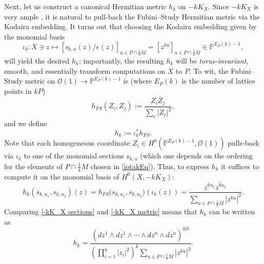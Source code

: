 \documentclass{article}
\newcommand\cO{{\mathcal O}}
\newcommand{\PP}{{\mathbb P}}
\renewcommand{\>}{\rightarrow}
\theoremstyle{plain}
\theoremstyle{definition}
\newcommand{\beq}{\begin{equation}}
\newcommand{\eeq}{\end{equation}}
\def\lb#1{\label{#1}}
\begin{document}
Next, let us construct a canonical Hermitian metric $h_k$ on $-kK_X$. 
Since $-kK_X$ is very ample \cite[p. 70]{Ful}, it is natural to pull-back the Fubini--Study Hermitian metric via the Kodaira embedding. It turns
out that choosing the Kodaira embedding given by the monomial basis 
\begin{equation}\label{iotakEq}
\iota_k:X\ni z\mapsto [s_{k,u}(z)/e(z)]_{u\in P\cap \frac1k M}=[z^{ku}]_{u\in P\cap \frac1k M}\in \PP^{E_P(k)-1},
\end{equation}
will yield the desired $h_k$; importantly, the resulting $h_k$
will be {\it torus-invariant}, smooth, and essentially transform computations
on $X$ to $P$.
To wit, the Fubini--Study metric on $\cO(1)\rightarrow
\PP^{E_P(k)-1}$ is (where $E_P(k)$ is the number of lattice
points in $kP$)
$$
h_{FS}(Z_i,Z_j):=\frac{Z_i\bar Z_j}{\sum_\ell|Z_\ell|^2},
$$
and we define
\beq
\lb{hkiotaEq}
h_k:=\iota_k^*h_{FS}.
\eeq
Note that each homogeneous coordinate $Z_i\in H^0(\PP^{E_P(k)-1},\cO(1))$ pulls-back
via $\iota_k$ to one of the monomial sections $s_{k,u}$ (which one depends 
on the ordering for the elements of $P\cap \frac1k M$ chosen in \eqref{iotakEq}). 
Thus, to express $h_k$ it suffices to compute it on the monomial basis of $H^0(X,-kK_X)$:
\begin{equation}\label{-kK_X metric}
    h_k(s_{k,u_1},s_{k,u_2})(z)
    =
    h_{FS}\big(s_{k,u_1},s_{k,u_2}\big)(\iota_k(z))
    =
    \frac{z^{ku_1}\overline{z^{ku_2}}}{\sum\limits_{u\in P\cap \frac1k M}|z^{ku}|^2}.
\end{equation}
Comparing \eqref{-kK_X sections} and \eqref{-kK_X metric} means that $h_k$ can be written as
\begin{equation}\label{-kK_X metric-h_k}
h_k=\frac{\left(dz^1\wedge \overline{dz^1}\wedge\cdots\wedge
dz^n\wedge\overline{dz^n}\right)^{\otimes k}}{
\left(\prod\limits_{i=1}^n|z_i|^2\right)^k\sum\limits_{u\in P\cap \frac1k M}\left|z^{ku}\right|^2}.
\end{equation}
\end{document}
